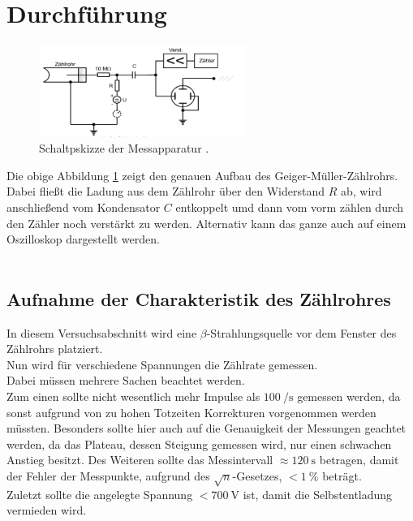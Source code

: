 \newpage
\section{Durchführung}

\begin{figure}[H]
    \centering
    \includegraphics[width=0.6\textwidth]{images/schaltplan.PNG}
    \caption{Schaltpskizze der Messapparatur \protect \cite{V703}.}
    \label{img:schalt}
\end{figure}
Die obige Abbildung \ref{img:schalt} zeigt den genauen Aufbau des Geiger-Müller-Zählrohrs. Dabei fließt die Ladung aus dem Zählrohr über den Widerstand $R$ ab, 
wird anschließend vom Kondensator $C$ entkoppelt umd dann vom vorm zählen durch den Zähler noch verstärkt zu werden. Alternativ kann das ganze auch auf einem Oszilloskop dargestellt werden.\\\\

\subsection{Aufnahme der Charakteristik des Zählrohres}


\noindent
In diesem Versuchsabschnitt wird eine $\beta$-Strahlungsquelle vor dem Fenster des Zählrohrs platziert.\\
Nun wird für verschiedene Spannungen die Zählrate gemessen.\\
Dabei müssen mehrere Sachen beachtet werden.\\
Zum einen sollte nicht wesentlich mehr Impulse als $\SI{100}{\per\second}$ gemessen werden, da sonst aufgrund von zu hohen Totzeiten Korrekturen vorgenommen werden müssten.
Besonders sollte hier auch auf die Genauigkeit der Messungen geachtet werden, da das Plateau, dessen Steigung gemessen wird, nur einen schwachen Anstieg besitzt.
Des Weiteren sollte das Messintervall $\approx\SI{120}{\second}$ betragen, damit der Fehler der Messpunkte, aufgrund des $\sqrt{n}$-Gesetzes, $<\SI{1}{\percent}$ beträgt.\\
Zuletzt sollte die angelegte Spannung $<\SI{700}{\volt}$ ist, damit die Selbstentladung vermieden wird.\\\\

